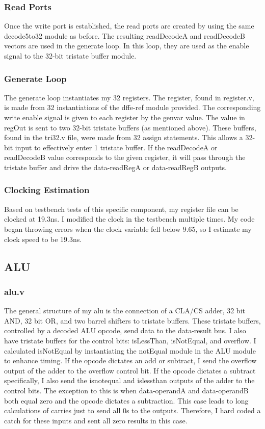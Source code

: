 \documentclass[letterpaper]{article} %
\begin{document}
\subsubsection{Read Ports}
Once the write port is established, the read ports are created by using the same decode5to32 module as before. The resulting readDecodeA and readDecodeB vectors are used in the generate loop. In this loop, they are used as the enable signal to the 32-bit tristate buffer module.
\subsubsection{Generate Loop}
The generate loop instantiates my 32 registers. The register, found in register.v, is made from 32 instantiations of the dffe-ref module provided. The corresponding write enable signal is given to each register by the genvar value. The value in regOut is sent to two 32-bit tristate buffers (as mentioned above). These buffers, found in the tri32.v file, were made from 32 assign statements. This allows a 32-bit input to effectively enter 1 tristate buffer. If the readDecodeA or readDecodeB value corresponds to the given register, it will pass through the tristate buffer and drive the data-readRegA or data-readRegB outputs.
\subsubsection{Clocking Estimation}
Based on testbench tests of this specific component, my register file can be clocked at 19.3ns. I modified the clock in the testbench multiple times. My code began throwing errors when the clock variable fell below 9.65, so I estimate my clock speed to be 19.3ns.

\subsection{ALU}
\subsubsection{alu.v}
The general structure of my alu is the connection of a CLA/CS adder, 32 bit AND, 32 bit OR, and two barrel shifters to tristate buffers. These tristate buffers, controlled by a decoded ALU opcode, send data to the data-result bus. I also have tristate buffers for the control bits: isLessThan, isNotEqual, and overflow. I calculated isNotEqual by instantiating the notEqual module in the ALU module to enhance timing. If the opcode dictates an add or subtract, I send the overflow output of the adder to the overflow control bit. If the opcode dictates a subtract specifically, I also send the isnotequal and islessthan outputs of the adder to the control bits. The exception to this is when data-operandA and data-operandB both equal zero and the opcode dictates a subtraction. This case leads to long calculations of carries just to send all 0s to the outputs. Therefore, I hard coded a catch for these inputs and sent all zero results in this case.
\end{document}
